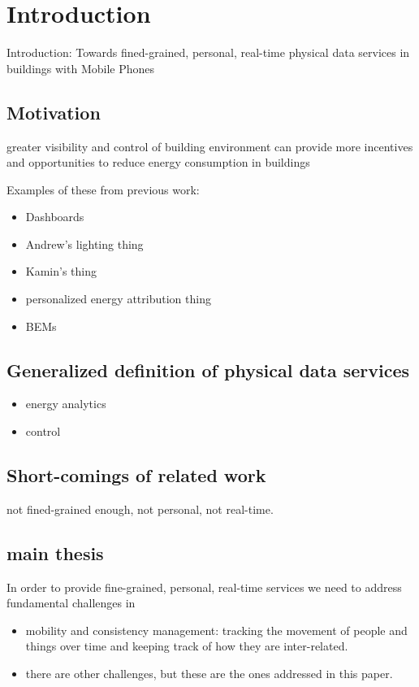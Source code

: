 \section{Introduction}
Introduction: Towards fined-grained, personal, real-time physical data services in buildings with Mobile Phones

\subsection{Motivation} 
greater visibility and control of building environment can provide more incentives and opportunities to reduce energy consumption in buildings

Examples of these from previous work:
\begin{itemize}
\item Dashboards
\item Andrew’s lighting thing
\item Kamin’s thing
\item personalized energy attribution thing
\item BEMs
\end{itemize}

\subsection{Generalized definition of physical data services}

\begin{itemize}
\item energy analytics
\item control
\end{itemize}

\subsection{Short-comings of related work}
not fined-grained enough, not personal, not real-time.

\subsection{main thesis}  
In order to provide fine-grained, personal, real-time services we need to address fundamental challenges in

\begin{itemize}
\item mobility and consistency management: tracking the movement of people and things over time and keeping track of how they are inter-related.
\item there are other challenges, but these are the ones addressed in this paper.
\end{itemize}
